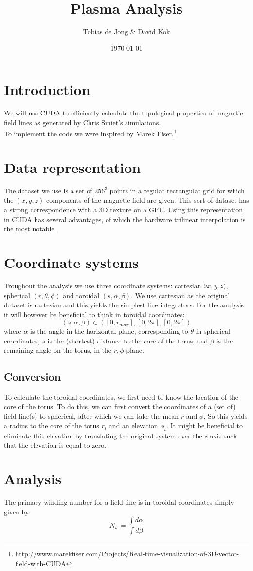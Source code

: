 \documentclass{article}
\begin{document}
\title{Plasma Analysis}
\author{Tobias de Jong \& David Kok}
\date{\today}
\maketitle
\section{Introduction}
We will use CUDA to efficiently calculate the topological properties of magnetic field lines as generated by Chris Smiet's simulations.\cite{PhysRevLett.115.095001}\\
To implement the code we were inspired by Marek Fiser.\footnote{\url{http://www.marekfiser.com/Projects/Real-time-visualization-of-3D-vector-field-with-CUDA}}
\section{Data representation}
The dataset we use is a set of $256^3$ points in a regular rectangular grid for which the $(x,y,z)$ components of the magnetic field are given. This sort of dataset has a strong correspondence with a 3D texture on a GPU. Using this representation in CUDA has several advantages, of which the hardware trilinear interpolation is the most notable.
\section{Coordinate systems}
Troughout the analysis we use three coordinate systems: cartesian $9x,y,z)$, spherical $(r,\theta,\phi)$ and toroidal $(s,\alpha, \beta)$. We use cartesian as the original dataset is cartesian and this yields the simplest line integrators. For the analysis it will however be beneficial to think in toroidal coordinates:
\[(s,\alpha,\beta)\in ([0,r_{max}],[0,2\pi],[0,2\pi])\]
where $\alpha$ is the angle in the horizontal plane, corresponding to $\theta$ in spherical coordinates, $s$ is the (shortest) distance to the core of the torus, and $\beta$ is the remaining angle on the torus, in the $r,\phi$-plane.
\subsection{Conversion}
To calculate the toroidal coordinates, we first need to know the location of the core of the torus. To do this, we can first convert the coordinates of a (set of) field line(s) to spherical, after which we can take the mean $r$ and $\phi$. So this yields a radius to the core of the torus $r_t$ and an elevation $\phi_t$. It might be beneficial to eliminate this elevation by translating the original system over the $z$-axis such that the elevation is equal to zero.
\section{Analysis}
The primary winding number for a field line is in toroidal coordinates simply given by:
\[N_w = \frac{\int d\alpha}{\int d\beta}\]


\end{document}
